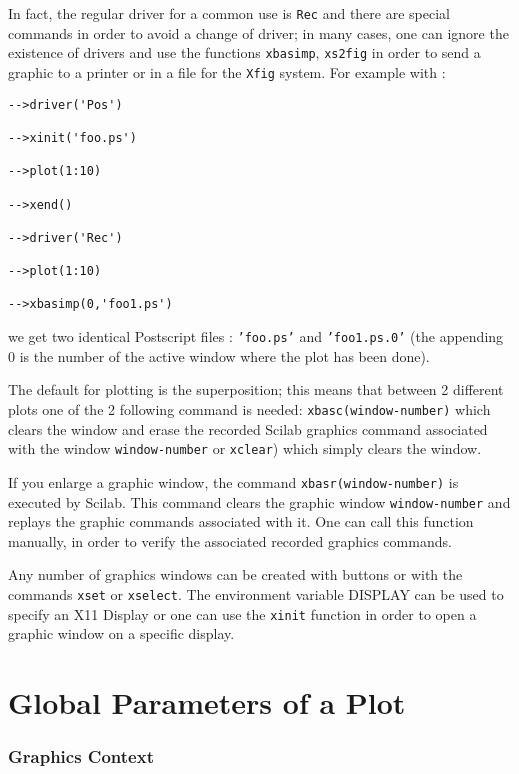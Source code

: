 In fact, the regular driver for a common use is {\tt Rec} and there
are special commands in order to avoid a change of driver; in many
cases, one can ignore the existence of drivers and use the
functions \verb+xbasimp+, \verb+xs2fig+ in order to send a graphic 
to a printer or in a file for the \verb+Xfig+ system. For example with
:

\begin{verbatim}
-->driver('Pos')
 
-->xinit('foo.ps')
 
-->plot(1:10)
 
-->xend()
 
-->driver('Rec')
 
-->plot(1:10)
 
-->xbasimp(0,'foo1.ps')

\end{verbatim}

\noindent we get two identical Postscript files : {\tt 'foo.ps'} and {\tt 'foo1.ps.0'}
(the appending 0 is the number of the active window where the plot has been 
done).

The default for plotting is the superposition; this means that between
2 different plots one of the 2 following command is needed:
{\tt xbasc(window-number)} which clears the window and erase the
recorded Scilab graphics command associated with the window 
\verb+window-number+ or {\tt xclear}) which simply clears the window.

If you enlarge a graphic window, the command \verb+xbasr(window-number)+
is executed by Scilab. This command clears the graphic window
\verb+window-number+ and replays the graphic commands associated with it. One 
can call this function manually, in order to verify the associated
recorded graphics commands. 

Any number of graphics windows can be created with buttons 
or with the commands \verb+xset+ or \verb+xselect+. The environment 
variable DISPLAY can be used to specify an X11 Display or one can use
the \verb+xinit+ function in order to open a graphic window on a
specific display. 

\section{Global Parameters of a Plot}
\subsubsection{Graphics Context}

